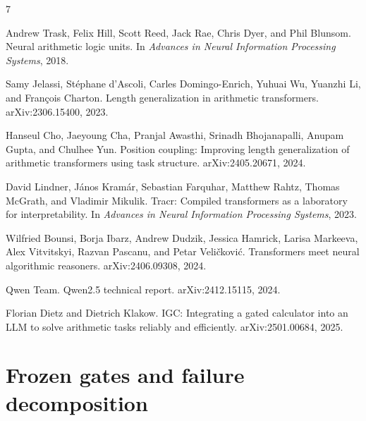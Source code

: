 \documentclass{article}
\begin{document}
\begin{thebibliography}{7}

Andrew Trask, Felix Hill, Scott Reed, Jack Rae, Chris Dyer, and Phil Blunsom.
\newblock Neural arithmetic logic units.
\newblock In \emph{Advances in Neural Information Processing Systems}, 2018.

Samy Jelassi, St{\'e}phane d'Ascoli, Carles Domingo-Enrich, Yuhuai Wu,
Yuanzhi Li, and Fran{\c{c}}ois Charton.
\newblock Length generalization in arithmetic transformers.
\newblock arXiv:2306.15400, 2023.

Hanseul Cho, Jaeyoung Cha, Pranjal Awasthi, Srinadh Bhojanapalli, Anupam Gupta,
and Chulhee Yun.
\newblock Position coupling: Improving length generalization of arithmetic
transformers using task structure.
\newblock arXiv:2405.20671, 2024.

David Lindner, J{\'a}nos Kram{\'a}r, Sebastian Farquhar, Matthew Rahtz,
Thomas McGrath, and Vladimir Mikulik.
\newblock Tracr: Compiled transformers as a laboratory for interpretability.
\newblock In \emph{Advances in Neural Information Processing Systems}, 2023.

Wilfried Bounsi, Borja Ibarz, Andrew Dudzik, Jessica Hamrick, Larisa Markeeva,
Alex Vitvitskyi, Razvan Pascanu, and Petar Veli{\v{c}}kovi{\'c}.
\newblock Transformers meet neural algorithmic reasoners.
\newblock arXiv:2406.09308, 2024.

Qwen Team.
\newblock Qwen2.5 technical report.
\newblock arXiv:2412.15115, 2024.

Florian Dietz and Dietrich Klakow.
\newblock IGC: Integrating a gated calculator into an LLM to solve arithmetic
tasks reliably and efficiently.
\newblock arXiv:2501.00684, 2025.

\end{thebibliography}

\clearpage
\appendix
\section{Frozen gates and failure decomposition}
\end{document}
